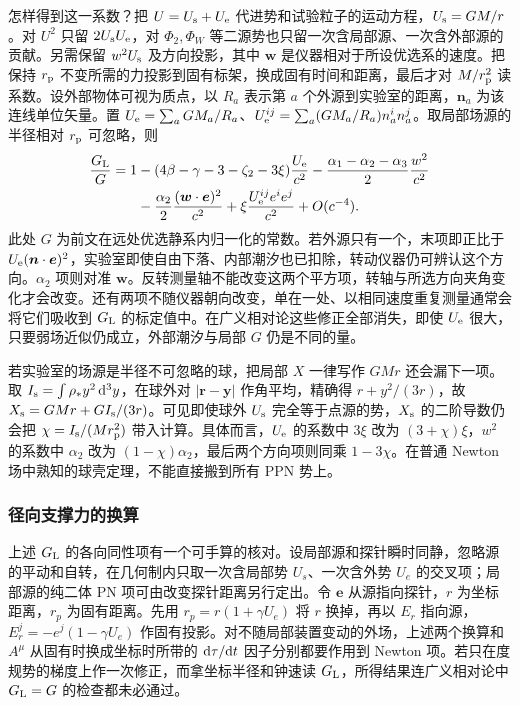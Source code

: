 怎样得到这一系数？把 $U=U_{\rm s}+U_{\rm e}$ 代进势和试验粒子的运动方程，$U_{\rm s}=GM/r$。对 $U^2$ 只留 $2U_{\rm s}U_{\rm e}$，对 $\Phi_2,\Phi_W$ 等二源势也只留一次含局部源、一次含外部源的贡献。另需保留 $w^2U_{\rm s}$ 及方向投影，其中 $\bm w$ 是仪器相对于所设优选系的速度。把保持 $r_{\rm p}$ 不变所需的力投影到固有标架，换成固有时间和距离，最后才对 $M/r_{\rm p}^2$ 读系数。设外部物体可视为质点，以 $R_a$ 表示第 $a$ 个外源到实验室的距离，$\bm n_a$ 为该连线单位矢量。置 $U_{\rm e}=\sum_a GM_a/R_a$、$U_{\rm e}^{ij}=\sum_a (GM_a/R_a)n_a^in_a^j$。取局部场源的半径相对 $r_{\rm p}$ 可忽略，则
\begin{align*}
 \frac{G_{\rm L}}{G}=1
 &- (4\beta-\gamma-3-\zeta_2-3\xi)\frac{U_{\rm e}}{c^2}
 -\frac{\alpha_1-\alpha_2-\alpha_3}{2}\frac{w^2}{c^2}\\
 &-\frac{\alpha_2}{2}\frac{(\bm w\cdot\bm e)^2}{c^2}
 +\xi\frac{U_{\rm e}^{ij}e^ie^j}{c^2}+O(c^{-4}).
\end{align*}
此处 $G$ 为前文在远处优选静系内归一化的常数。若外源只有一个，末项即正比于 $U_{\rm e}(\bm n\cdot\bm e)^2$，实验室即使自由下落、内部潮汐也已扣除，转动仪器仍可辨认这个方向。$\alpha_2$ 项则对准 $\bm w$。反转测量轴不能改变这两个平方项，转轴与所选方向夹角变化才会改变。还有两项不随仪器朝向改变，单在一处、以相同速度重复测量通常会将它们吸收到 $G_{\rm L}$ 的标定值中。在广义相对论这些修正全部消失，即使 $U_{\rm e}$ 很大，只要弱场近似仍成立，外部潮汐与局部 $G$ 仍是不同的量。

若实验室的场源是半径不可忽略的球，把局部 $X$ 一律写作 $GMr$ 还会漏下一项。取 $I_{\rm s}=\int\rho_*y^2\,\dd^3y$，在球外对 $|\bm r-\bm y|$ 作角平均，精确得 $r+y^2/(3r)$，故 $X_{\rm s}=GMr+GI_{\rm s}/(3r)$。可见即使球外 $U_{\rm s}$ 完全等于点源的势，$X_{\rm s}$ 的二阶导数仍会把 $\chi=I_{\rm s}/(M r_{\rm p}^2)$ 带入计算。具体而言，$U_{\rm e}$ 的系数中 $3\xi$ 改为 $(3+\chi)\xi$，$w^2$ 的系数中 $\alpha_2$ 改为 $(1-\chi)\alpha_2$，最后两个方向项则同乘 $1-3\chi$。在普通 Newton 场中熟知的球壳定理，不能直接搬到所有 PPN 势上。

\subsubsection{径向支撑力的换算}

上述 $G_{\rm L}$ 的各向同性项有一个可手算的核对。设局部源和探针瞬时同静，忽略源的平动和自转，在几何制内只取一次含局部势 $U_s$、一次含外势 $U_e$ 的交叉项；局部源的纯二体 PN 项可由改变探针距离另行定出。令 $\bm e$ 从源指向探针，$r$ 为坐标距离，$r_p$ 为固有距离。先用 $r_p=r(1+\gamma U_e)$ 将 $r$ 换掉，再以 $E_r$ 指向源，$E_r^j=-e^j(1-\gamma U_e)$ 作固有投影。对不随局部装置变动的外场，上述两个换算和 $A^\mu$ 从固有时换成坐标时所带的 $\dd\tau/\dd t$ 因子分别都要作用到 Newton 项。若只在度规势的梯度上作一次修正，而拿坐标半径和钟速读 $G_{\rm L}$，所得结果连广义相对论中 $G_{\rm L}=G$ 的检查都未必通过。

